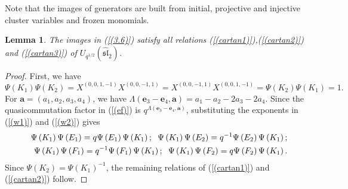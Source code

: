 \documentclass[reqno,11pt]{amsart}
\numberwithin{equation}{section}
\newtheorem{lemma}[theorem]{Lemma}
\begin{document}
Note that the  images of generators are built from initial, projective and injective cluster variables and frozen monomials.
\begin{lemma}\label{3.3}
 The images in (\ref{(3.6)}) satisfy all  relations (\ref{(cartan1)}),(\ref{(cartan2)}) and (\ref{(cartan3)}) of $U_{q^{1/2}}(\widehat{\mathfrak{s l}}_2)$.
\end{lemma}
\begin{proof}
 First, we have
$$
\Psi\left(K_1\right) \Psi\left(K_2\right)=X^{(0,0,1,-1)} X^{(0,0,-1,1)}=X^{(0,0,-1,1)} X^{(0,0,1,-1)}=\Psi\left(K_2\right) \Psi\left(K_1\right)=1 .
$$
For $\mathbf{a}=\left(a_1, a_2, a_3, a_4\right)$, we have $\Lambda\left(\mathbf{e}_3-\mathbf{e}_4, \mathbf{a}\right)=a_1-a_2-2 a_3-2 a_4$. Since the quasicommutation factor in (\ref{(ef)}) is $q^{\Lambda\left(\mathbf{e}_3-\mathbf{e}_4, \mathbf{a}\right)}$, substituting the exponents in (\ref{(w1)}) and (\ref{(w2)}) gives
\begin{eqnarray*}
	&&\Psi\left(K_1\right) \Psi\left(E_1\right)=q \Psi\left(E_1\right) \Psi\left(K_1\right); \hspace{0.2cm}
	 \Psi\left(K_1\right) \Psi\left(E_2\right)=q^{-1} \Psi\left(E_2\right) \Psi\left(K_1\right); \\
	&&\Psi\left(K_1\right) \Psi\left(F_1\right)=q^{-1} \Psi\left(F_1\right) \Psi\left(K_1\right); \hspace{0.2cm}
	 \Psi\left(K_1\right) \Psi\left(F_2\right)=q \Psi\left(F_2\right) \Psi\left(K_1\right) .
\end{eqnarray*}
Since $\Psi\left(K_2\right)=\Psi\left(K_1\right)^{-1}$, the remaining  relations of (\ref{(cartan1)}) and (\ref{(cartan2)}) follow.


\end{proof}
\end{document}

